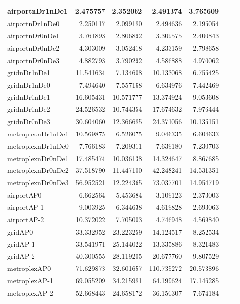 \begin{longtable}{|l|r|r|r|r|r|r|}
\endlastfoot
airportnDr1nDe1 & 2.475757 & 2.352062 & 2.491374 & 3.765609 \\ \hline
airportnDr1nDe0 & 2.250117 & 2.099180 & 2.494636 & 2.195054 \\ \hline
airportnDr0nDe1 & 3.761893 & 2.806892 & 3.309575 & 2.400843 \\ \hline
airportnDr0nDe2 & 4.303009 & 3.052418 & 4.233159 & 2.798658 \\ \hline
airportnDr0nDe3 & 4.882793 & 3.790292 & 4.586888 & 4.970062 \\ \hline
gridnDr1nDe1 & 11.541634 & 7.134608 & 10.133068 & 6.755425 \\ \hline
gridnDr1nDe0 & 7.494640 & 7.557168 & 6.634976 & 7.442469 \\ \hline
gridnDr0nDe1 & 16.605431 & 10.571777 & 13.374924 & 9.053608 \\ \hline
gridnDr0nDe2 & 24.526532 & 10.744354 & 17.674632 & 7.976444 \\ \hline
gridnDr0nDe3 & 30.604060 & 12.366685 & 24.371056 & 10.135151 \\ \hline
metroplexnDr1nDe1 & 10.569875 & 6.526075 & 9.046335 & 6.604633 \\ \hline
metroplexnDr1nDe0 & 7.766183 & 7.209311 & 7.639180 & 7.230703 \\ \hline
metroplexnDr0nDe1 & 17.485474 & 10.036138 & 14.324647 & 8.867685 \\ \hline
metroplexnDr0nDe2 & 37.518790 & 11.447100 & 42.248241 & 14.531351 \\ \hline
metroplexnDr0nDe3 & 56.952521 & 12.224365 & 73.037701 & 14.954719 \\ \hline
airportAP0 & 6.662564 & 5.453684 & 3.109123 & 2.373003 \\ \hline
airportAP-1 & 9.003925 & 6.344638 & 4.619828 & 2.693063 \\ \hline
airportAP-2 & 10.372022 & 7.705003 & 4.746948 & 4.569840 \\ \hline
gridAP0 & 33.332952 & 23.223259 & 14.124517 & 8.252534 \\ \hline
gridAP-1 & 33.541971 & 25.144022 & 13.335886 & 8.321483 \\ \hline
gridAP-2 & 40.300555 & 28.119205 & 20.677760 & 9.807529 \\ \hline
metroplexAP0 & 71.629873 & 32.601657 & 110.735272 & 20.573896 \\ \hline
metroplexAP-1 & 69.055209 & 34.215981 & 64.199624 & 17.146285 \\ \hline
metroplexAP-2 & 52.668443 & 24.658172 & 36.150307 & 7.674184 \\ \hline

\end{longtable}
